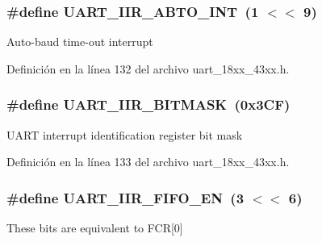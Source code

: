 \subsubsection[{\texorpdfstring{U\+A\+R\+T\+\_\+\+I\+I\+R\+\_\+\+A\+B\+T\+O\+\_\+\+I\+NT}{UART_IIR_ABTO_INT}}]{\setlength{\rightskip}{0pt plus 5cm}\#define U\+A\+R\+T\+\_\+\+I\+I\+R\+\_\+\+A\+B\+T\+O\+\_\+\+I\+NT~(1 $<$$<$ 9)}\hypertarget{group___u_a_r_t__18_x_x__43_x_x_ga29486c78b0afdb4b3943defe36d5404c}{}\label{group___u_a_r_t__18_x_x__43_x_x_ga29486c78b0afdb4b3943defe36d5404c}
Auto-\/baud time-\/out interrupt 

Definición en la línea 132 del archivo uart\+\_\+18xx\+\_\+43xx.\+h.

\subsubsection[{\texorpdfstring{U\+A\+R\+T\+\_\+\+I\+I\+R\+\_\+\+B\+I\+T\+M\+A\+SK}{UART_IIR_BITMASK}}]{\setlength{\rightskip}{0pt plus 5cm}\#define U\+A\+R\+T\+\_\+\+I\+I\+R\+\_\+\+B\+I\+T\+M\+A\+SK~(0x3\+C\+F)}\hypertarget{group___u_a_r_t__18_x_x__43_x_x_gad443b74131fa7b7aecf0f1c581172faa}{}\label{group___u_a_r_t__18_x_x__43_x_x_gad443b74131fa7b7aecf0f1c581172faa}
U\+A\+RT interrupt identification register bit mask 

Definición en la línea 133 del archivo uart\+\_\+18xx\+\_\+43xx.\+h.

\subsubsection[{\texorpdfstring{U\+A\+R\+T\+\_\+\+I\+I\+R\+\_\+\+F\+I\+F\+O\+\_\+\+EN}{UART_IIR_FIFO_EN}}]{\setlength{\rightskip}{0pt plus 5cm}\#define U\+A\+R\+T\+\_\+\+I\+I\+R\+\_\+\+F\+I\+F\+O\+\_\+\+EN~(3 $<$$<$ 6)}\hypertarget{group___u_a_r_t__18_x_x__43_x_x_ga29b20e73585acb416f112502d29554d7}{}\label{group___u_a_r_t__18_x_x__43_x_x_ga29b20e73585acb416f112502d29554d7}
These bits are equivalent to F\+CR\mbox{[}0\mbox{]} 


